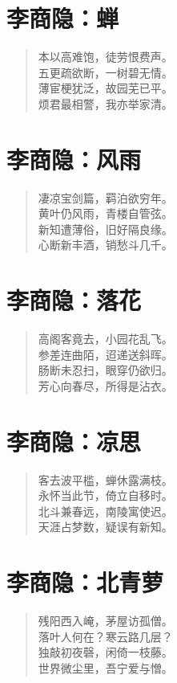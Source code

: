 \documentclass[12pt,oneside]{book}
\newenvironment{shici}{
\begin{verse}
\centering\large\hspace{12pt}}
{\end{verse}}
\begin{document}
\chapter{李商隐：蝉}
\begin{shici}
本以高难饱，徒劳恨费声。\\
五更疏欲断，一树碧无情。\\
薄宦梗犹泛，故园芜已平。\\
烦君最相警，我亦举家清。
\end{shici}

\chapter{李商隐：风雨}
\begin{shici}
凄凉宝剑篇，羁泊欲穷年。\\
黄叶仍风雨，青楼自管弦。\\
新知遭薄俗，旧好隔良缘。\\
心断新丰酒，销愁斗几千。
\end{shici}

\chapter{李商隐：落花}
\begin{shici}
高阁客竟去，小园花乱飞。\\
参差连曲陌，迢递送斜晖。\\
肠断未忍扫，眼穿仍欲归。\\
芳心向春尽，所得是沾衣。
\end{shici}

\chapter{李商隐：凉思}
\begin{shici}
客去波平槛，蝉休露满枝。\\
永怀当此节，倚立自移时。\\
北斗兼春远，南陵寓使迟。\\
天涯占梦数，疑误有新知。
\end{shici}

\chapter{李商隐：北青萝}
\begin{shici}
残阳西入崦，茅屋访孤僧。\\
落叶人何在？寒云路几层？\\
独敲初夜磬，闲倚一枝藤。\\
世界微尘里，吾宁爱与憎。
\end{shici}
\end{document}
